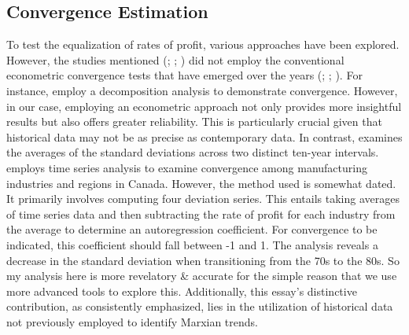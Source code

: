 \documentclass[10pt]{article}
\begin{document}
\subsection{Convergence Estimation}
\par To test the equalization of rates of profit, various approaches have been explored. However, the studies mentioned (\citet{ChouIzyumovVahaly2015}; \citet{Carter2004}; \citet{Glyn2004}) did not employ the conventional econometric convergence tests that have emerged over the years (\citet{BarroSalaIMartin1997}; \citet{LuginbuhlKoopman2004}; \citet{PhillipsSul2007}). For instance, \citet{ChouIzyumovVahaly2015} employ a decomposition analysis to demonstrate convergence. However, in our case, employing an econometric approach not only provides more insightful results but also offers greater reliability. This is particularly crucial given that historical data may not be as precise as contemporary data. In contrast, \citet{Glyn2004} examines the averages of the standard deviations across two distinct ten-year intervals. \citet{rigby1991technical} employs time series analysis to examine convergence among manufacturing industries and regions in Canada. However, the method used is somewhat dated. It primarily involves computing four deviation series. This entails taking averages of time series data and then subtracting the rate of profit for each industry from the average to determine an autoregression coefficient. For convergence to be indicated, this coefficient should fall between -1 and 1. The analysis reveals a decrease in the standard deviation when transitioning from the 70s to the 80s. So my analysis here is more revelatory \& accurate for the simple reason that we use more advanced tools to explore this. Additionally, this essay's distinctive contribution, as consistently emphasized, lies in the utilization of historical data not previously employed to identify Marxian trends. 
\end{document}
